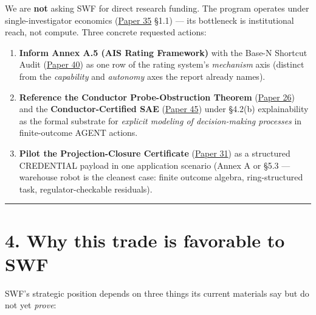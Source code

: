 \documentclass[
  letterpaper,
  11pt]{article}
\providecommand{\tightlist}{%
  \setlength{\itemsep}{0pt}\setlength{\parskip}{0pt}}
\theoremstyle{plain}
\theoremstyle{definition}
\theoremstyle{remark}
\begin{document}
We are \textbf{not} asking SWF for direct research funding. The program operates under single-investigator economics (\href{C:/Projects/simplicial/35_grounded_paranoid_delusional_methodology.md}{Paper 35} §1.1) --- its bottleneck is institutional reach, not compute. Three concrete requested actions:

\begin{enumerate}
\def\labelenumi{\arabic{enumi}.}
\tightlist
\item
  \textbf{Inform Annex A.5 (AIS Rating Framework)} with the Base-N Shortcut Audit (\href{C:/Projects/simplicial/40_base_n_shortcut_audit_as_a_safety_primitive.md}{Paper 40}) as one row of the rating system's \emph{mechanism} axis (distinct from the \emph{capability} and \emph{autonomy} axes the report already names).
\item
  \textbf{Reference the Conductor Probe-Obstruction Theorem} (\href{C:/Projects/simplicial/26.conductor_probe_obstruction_theorem.md}{Paper 26}) and the \textbf{Conductor-Certified SAE} (\href{C:/Projects/simplicial/45_conductor_certified_sparse_autoencoders.md}{Paper 45}) under §4.2(b) explainability as the formal substrate for \emph{explicit modeling of decision-making processes} in finite-outcome AGENT actions.
\item
  \textbf{Pilot the Projection-Closure Certificate} (\href{C:/Projects/simplicial/31.projection_closure_theory.md}{Paper 31}) as a structured CREDENTIAL payload in one application scenario (Annex A or §5.3 --- warehouse robot is the cleanest case: finite outcome algebra, ring-structured task, regulator-checkable residuals).
\end{enumerate}

\begin{center}\rule{0.5\linewidth}{0.5pt}\end{center}

\section{4. Why this trade is favorable to SWF}\label{why-this-trade-is-favorable-to-swf}

SWF's strategic position depends on three things its current materials say but do not yet \emph{prove}:
\end{document}
